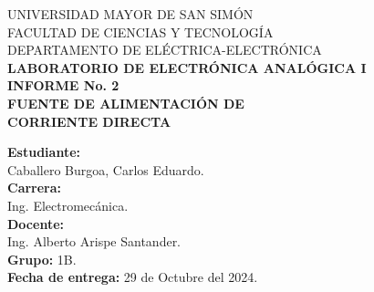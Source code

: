 \documentclass[letter,twoside,11pt]{report}
\newcommand{\blankpage}{
\newpage
\thispagestyle{empty}
\mbox{}
\newpage
}
\begin{document}
\begin{titlepage}
    \begin{center}
        {\Large UNIVERSIDAD MAYOR DE SAN SIMÓN}\\
        \vspace*{0.15cm}
        {\large FACULTAD DE CIENCIAS Y TECNOLOGÍA}\\
        \vspace*{0.10cm}
        DEPARTAMENTO DE ELÉCTRICA-ELECTRÓNICA\\
        \vspace*{3.0cm}
        {\Large \textbf{LABORATORIO DE ELECTRÓNICA ANALÓGICA I}}\\
        \vspace*{0.3cm}
        {\Large \textbf{INFORME No. 2}}\\
        \vspace*{3.5cm}
        {\Large \textbf{FUENTE DE ALIMENTACIÓN DE \\
        CORRIENTE DIRECTA}}\\
    \end{center}

    \vspace*{5.8cm}
    \leftskip=7.95cm
    \noindent
    \textbf{Estudiante:}\\
    Caballero Burgoa, Carlos Eduardo.\\
    \newline
    \textbf{Carrera:}\\
    Ing. Electromecánica.\\
    \newline
    \textbf{Docente:}\\
    Ing. Alberto Arispe Santander.\\
    \newline
    \textbf{Grupo:} 1B.\\
    \textbf{Fecha de entrega:} 29 de Octubre del 2024.\\
\end{titlepage}
\addtocounter{page}{-1}

\blankpage
\addtocounter{page}{-1}

\tableofcontents
\blankpage
















\end{document}
